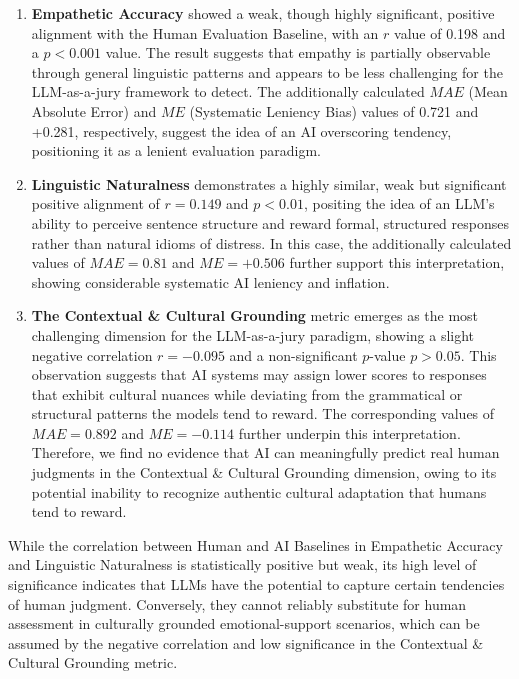 \documentclass[10pt, twocolumn]{article}
\begin{document}
\begin{enumerate}

\item \textbf{Empathetic Accuracy }showed a weak, though highly significant, positive alignment with the Human Evaluation Baseline, with an $r$ value of 0.198 and a $p < 0.001$ value. The result suggests that empathy is partially observable through general linguistic patterns and appears to be less challenging for the LLM-as-a-jury framework to detect. The additionally calculated $MAE$ (Mean Absolute Error) and $ME$ (Systematic Leniency Bias) values of 0.721 and +0.281, respectively, suggest the idea of an AI overscoring tendency, positioning it as a lenient evaluation paradigm.

\item \textbf{Linguistic Naturalness} demonstrates a highly similar, weak but significant positive alignment of $r = 0.149$ and $p < 0.01$, positing the idea of an LLM's ability to perceive sentence structure and reward formal, structured responses rather than natural idioms of distress. In this case, the additionally calculated values of $MAE = 0.81$ and $ME = +0.506$ further support this interpretation, showing considerable systematic AI leniency and inflation.

\item \textbf{The Contextual \& Cultural Grounding} metric emerges as the most challenging dimension for the LLM-as-a-jury paradigm, showing a slight negative correlation $r=-0.095$ and a non-significant $p$-value $p>0.05$. This observation suggests that AI systems may assign lower scores to responses that exhibit cultural nuances while deviating from the grammatical or structural patterns the models tend to reward. The corresponding values of $MAE=0.892$ and $ME=-0.114$ further underpin this interpretation. Therefore, we find no evidence that AI can meaningfully predict real human judgments in the Contextual \& Cultural Grounding dimension, owing to its potential inability to recognize authentic cultural adaptation that humans tend to reward.

\end{enumerate}

While the correlation between Human and AI Baselines in Empathetic Accuracy and Linguistic Naturalness is statistically positive but weak, its high level of significance indicates that LLMs have the potential to capture certain tendencies of human judgment. Conversely, they cannot reliably substitute for human assessment in culturally grounded emotional-support scenarios, which can be assumed by the negative correlation and low significance in the Contextual \& Cultural Grounding metric.
\end{document}
